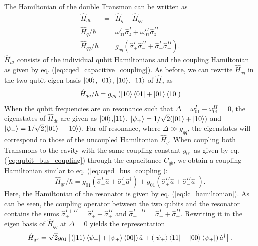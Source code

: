 The Hamiltonian of the double Transmon can be written as \citep{srinivasan_tunable_2011,gambetta_superconducting_2011}
%
\begin{eqnarray}
\hat{H}_{dt}       & = & \hat{H}_q+\hat{H}_{qq} \\
\hat{H}_{q}/\hbar  & = & \omega_{01}^I\hat{\sigma}_z^I+\omega_{01}^{II}\hat{\sigma}_z^{II} \\
\hat{H}_{qq}/\hbar & = & g_{qq}\left(\hat{\sigma}_+^I\hat{\sigma}_-^{II}+\hat{\sigma}_-^I\hat{\sigma}_+^{II}\right).
\end{eqnarray}
%
$\hat{H}_{dt}$ consists of the individual qubit Hamiltonians and the coupling Hamiltonian as given by eq. (\ref{eq:cqed_capacitive_coupling}). As before, we can rewrite $\hat{H}_{qq}$ in the two-qubit eigen basis $\left| 00 \right>$, $\left| 01 \right>$, $\left| 10 \right>$, $\left| 11 \right>$ of $\hat{H}_q$ as
%
\begin{equation}
\hat{H}_{qq}/\hbar = g_{qq}\left(\left| 10 \right>\left< 01 \right|+\left| 01 \right>\left< 10 \right|\right)
\end{equation}
%
When the qubit frequencies are on resonance such that $\Delta = \omega_{01}^I-\omega_{01}^{II}=0$, the eigenstates of $\hat{H}_{dt}$ are given as $\left| 00 \right>$,$\left| 11 \right>$, $\left| \psi_+ \right>=1/\sqrt{2}(\left| 01 \right>+\left| 10 \right>)$ and $\left| \psi_- \right>=1/\sqrt{2}(\left| 01 \right>-\left| 10 \right>)$. Far off resonance, where $\Delta \gg g_{qq}$, the eigenstates will correspond to those of the uncoupled Hamiltonian $\hat{H}_{q}$. When coupling both Transmons to the cavity with the same coupling constant $g_{01}$ as given by eq. (\ref{eq:qubit_bus_coupling}) through the capacitance $C_{qb}$, we obtain a coupling Hamiltonian similar to eq. (\ref{eq:cqed_bus_coupling}):
%
\begin{equation}
\hat{H}_{qr}/\hbar = g_{01}\left(\hat{\sigma}_+^I\hat{a}+\hat{\sigma}_-^I\hat{a}^\dagger\right)+g_{01}\left(\hat{\sigma}_+^{II}\hat{a}+\hat{\sigma}_-^{II}\hat{a}^\dagger \right). \label{eq:double_transmon_resonator_coupling}
\end{equation}
%
Here, the Hamiltonian of the resonator is given by eq. (\ref{eq:lc_hamiltonian}). As can be seen, the coupling operator between the two qubits and the resonator contains the sums $\hat{\sigma}_+^{I+II}=\hat{\sigma}_+^I+\hat{\sigma}_+^{II}$ and $\hat{\sigma}_-^{I+II}=\hat{\sigma}_-^I+\hat{\sigma}_-^{II}$. Rewriting it in the eigen basis of $\hat{H}_{qq}$ at $\Delta=0$ yields the representation
%
\begin{equation}
\hat{H}_{qr} = \sqrt{2}g_{01}\left[\left(\left| 11 \right>\left< \psi_+ \right|+\left| \psi_+ \right>\left< 00 \right|\right)\hat{a}+\left(\left| \psi_+ \right>\left< 11 \right|+\left| 00 \right>\left< \psi_+ \right|\right)\hat{a}^\dagger\right].
\end{equation}
